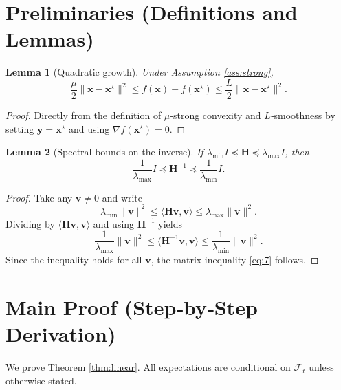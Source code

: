 \documentclass{article}
\newtheorem{lemma}{Lemma}
\newcommand{\ip}[2]{\langle #1,#2\rangle}
\newcommand{\grad}{\nabla}
\begin{document}
\newpage
\section*{Preliminaries (Definitions and Lemmas)}
\begin{lemma}[Quadratic growth]\label{lem:quad}
Under Assumption \ref{ass:strong},
\[
\frac{\mu}{2}\|\mathbf x-\mathbf x^{\star}\|^{2}\le f(\mathbf x)-f(\mathbf x^{\star})
\le\frac{L}{2}\|\mathbf x-\mathbf x^{\star}\|^{2}.
\tag{6}
\]
\end{lemma}
\begin{proof}
Directly from the definition of $\mu$‑strong convexity and $L$‑smoothness
by setting $\mathbf y=\mathbf x^{\star}$ and using $\grad f(\mathbf x^{\star})=0$.
\end{proof}

\begin{lemma}[Spectral bounds on the inverse]\label{lem:inv}
If $\lambda_{\min}I\preceq\mathbf H\preceq\lambda_{\max}I$, then
\[
\frac{1}{\lambda_{\max}}I\preceq\mathbf H^{-1}\preceq\frac{1}{\lambda_{\min}}I.
\tag{7}
\]
\end{lemma}
\begin{proof}
Take any $\mathbf v\neq0$ and write
\[
\lambda_{\min}\|\mathbf v\|^{2}\le\ip{\mathbf H\mathbf v}{\mathbf v}\le\lambda_{\max}\|\mathbf v\|^{2}.
\]
Dividing by $\ip{\mathbf H\mathbf v}{\mathbf v}$ and using $\mathbf H^{-1}$ yields
\[
\frac{1}{\lambda_{\max}}\|\mathbf v\|^{2}\le\ip{\mathbf H^{-1}\mathbf v}{\mathbf v}\le
\frac{1}{\lambda_{\min}}\|\mathbf v\|^{2}.
\]
Since the inequality holds for all $\mathbf v$, the matrix inequality \eqref{eq:7}
follows.\qedhere
\end{proof}

\section*{Main Proof (Step‑by‑Step Derivation)}
We prove Theorem \ref{thm:linear}.  
All expectations are conditional on $\mathcal F_{t}$ unless otherwise stated.
\end{document}
